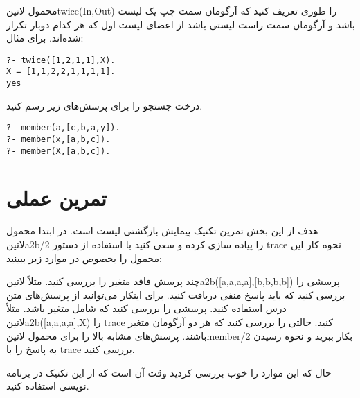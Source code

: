 \begin{exercise}
محمول ‌لاتین{twice(In,Out)} را طوری تعریف کنید که آرگومان سمت چپ یک لیست باشد و آرگومان سمت راست لیستی باشد از اعضای لیست اول که هر کدام دوبار تکرار شده‌اند. برای مثال:

\begin{latin}
\begin{lstlisting}
?- twice([1,2,1,1],X).
X = [1,1,2,2,1,1,1,1].
yes
\end{lstlisting}
\end{latin}

\end{exercise}

\begin{exercise}
درخت جستجو را برای پرسش‌های زیر رسم کنید.

\begin{latin}
\begin{lstlisting}
?- member(a,[c,b,a,y]).
?- member(x,[a,b,c]).
?- member(X,[a,b,c]).
\end{lstlisting}
\end{latin}

\end{exercise}

\section{تمرین عملی}

هدف از این بخش تمرین تکنیک پیمایش بازگشتی لیست است. در ابتدا محمول ‌لاتین{a2b/2} را پیاده سازی کرده و سعی کنید با استفاده از دستور trace نحوه کار این محمول را بخصوص در موارد زیر ببینید:

\begin{enumerate}
 چند پرسش فاقد متغیر را بررسی کنید. مثلاً ‌لاتین{a2b([a,a,a,a],[b,b,b,b])} 
 پرسشی را بررسی کنید که باید پاسخ منفی دریافت کنید. برای اینکار می‌توانید از پرسش‌های متن درس استفاده کنید.
 پرسشی را بررسی کنید که شامل متغیر باشد. مثلاً ‌لاتین{a2b([a,a,a,a],X)} را trace کنید.
 حالتی را بررسی کنید که هر دو آرگومان متغیر باشند.
 پرسش‌های مشابه بالا را برای محمول ‌لاتین{member/2} بکار ببرید و نحوه رسیدن به پاسخ را با trace بررسی کنید.
\end{enumerate}

حال که این موارد را خوب بررسی کردید وقت آن است که از این تکنیک در برنامه نویسی استفاده کنید.

